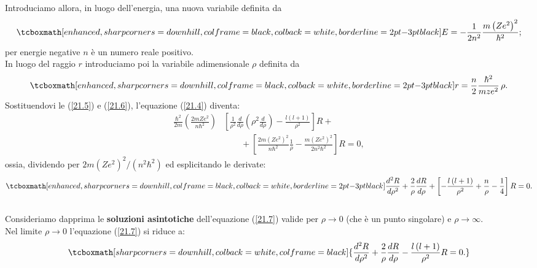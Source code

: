 \documentclass[a4paper,12pt,oneside]{book}
\begin{document}
Introduciamo allora, in luogo dell'energia, una nuova variabile definita da
	\begin{equation}
		\tcboxmath[enhanced, sharp corners=downhill, colframe=black, colback=white, borderline={2pt}{-3pt}{black}]{
			E=-\frac{1}{2n^2}\frac{m\left(Ze^2\right)^2}{\hbar^2} ;
			}
	\label{21.5}
	\end{equation}
per energie negative $n$ è un numero reale positivo.\\

In luogo del raggio $r$ introduciamo poi la variabile adimensionale $\rho$ definita da 
	\begin{equation}
		\tcboxmath[enhanced, sharp corners=downhill, colframe=black, colback=white, borderline={2pt}{-3pt}{black}]{
			r=\frac{n}{2}\frac{\hbar^2}{mze^2}\, \rho .
			}
	\label{21.6}
	\end{equation}
Sostituendovi le (\ref{21.5}) e (\ref{21.6}), l'equazione (\ref{21.4}) diventa:
	\begin{align}
		\frac{\hbar^2}{2m}\left(\frac{2mZe^2}{n\hbar^2}\right) &\left[\frac{1}{\rho^2}\frac{d}{d\rho}\left(\rho^2\frac{d}{d\rho}\right)   -\frac{l\left(l+1\right)}{\rho^2}\right]R +\nonumber \\
		& \qquad + \left[\frac{2m\left(Ze^2\right)^2}{n\hbar^2}\frac{1}{\rho}-\frac{m\left(Ze^2\right)^2}{2n^2\hbar^2}\right]R=0 ,
	\end{align}
ossia, dividendo per $2m\left(Ze^2\right)^2/\left(n^2\hbar^2\right)$ ed esplicitando le derivate:
	\begin{equation}
		\tcboxmath[enhanced, sharp corners=downhill, colframe=black, colback=white, borderline={2pt}{-3pt}{black}]{
			\frac{d^2R}{d\rho^2}+\frac{2}{\rho}\frac{dR}{d\rho}+\left[-\frac{l\left(l+1\right)}{\rho^2}+\frac{n}{\rho}-\frac{1}{4}\right]R=0 .
			}
	\label{21.7}
	\end{equation}\\

Consideriamo dapprima le \textbf{soluzioni asintotiche} dell'equazione (\ref{21.7}) valide per $\rho\rightarrow0$ (che è un punto singolare) e $\rho\rightarrow\infty$.\\

Nel limite \textbf{$\rho\rightarrow0$} l'equazione (\ref{21.7}) si riduce a:
	\begin{equation}
		\tcboxmath[sharp corners=downhill, colback=white, colframe=black]{
			\frac{d^2R}{d\rho^2}+\frac{2}{\rho}\frac{dR}{d\rho}-\frac{l\left(l+1\right)}{\rho^2}R=0 .
			}
	\label{21.8}
	\end{equation}\\
	
\end{document}

